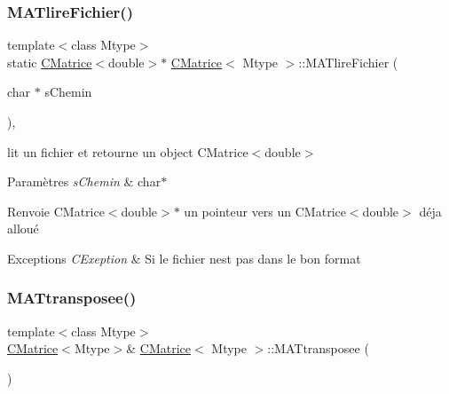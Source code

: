 \subsubsection{\texorpdfstring{M\+A\+Tlire\+Fichier()}{MATlireFichier()}}
{\footnotesize\ttfamily template$<$class Mtype$>$ \\
static \hyperlink{classCMatrice}{C\+Matrice}$<$double$>$$\ast$ \hyperlink{classCMatrice}{C\+Matrice}$<$ Mtype $>$\+::M\+A\+Tlire\+Fichier (\begin{DoxyParamCaption}\item[{char $\ast$}]{s\+Chemin }\end{DoxyParamCaption})\hspace{0.3cm}{\ttfamily [inline]}, {\ttfamily [static]}}



lit un fichier et retourne un object C\+Matrice$<$double$>$ 


\begin{DoxyParams}{Paramètres}
{\em s\+Chemin} & char$\ast$ \\
\hline
\end{DoxyParams}
\begin{DoxyReturn}{Renvoie}
C\+Matrice$<$double$>$$\ast$ un pointeur vers un C\+Matrice$<$double$>$ déja alloué 
\end{DoxyReturn}

\begin{DoxyExceptions}{Exceptions}
{\em C\+Exeption} & Si le fichier n\textquotesingle{}est pas dans le bon format \\
\hline
\end{DoxyExceptions}
\mbox{\label{classCMatrice_a0beb5a380bc021fa6abc352fc3d032b7}} 
\subsubsection{\texorpdfstring{M\+A\+Ttransposee()}{MATtransposee()}}
{\footnotesize\ttfamily template$<$class Mtype$>$ \\
\hyperlink{classCMatrice}{C\+Matrice}$<$Mtype$>$\& \hyperlink{classCMatrice}{C\+Matrice}$<$ Mtype $>$\+::M\+A\+Ttransposee (\begin{DoxyParamCaption}{ }\end{DoxyParamCaption})\hspace{0.3cm}{\ttfamily [inline]}}




